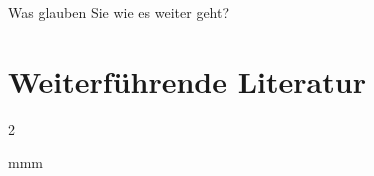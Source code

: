 \noindent Was glauben Sie wie es weiter geht?

\TakeNotesLarge


\section*{\protect\dsliterary{} Weiterführende Literatur}
\begin{WidePar}
\begin{multicols}{2}
\begin{labeling}{mmm}
  \item[\cite{AMLS3}] \emph{}
  \item[\cite{emergency9}] \emph{}
  \item[\cite{ITLSde6}] \emph{}
  \item[\cite{PHTLS6}] \emph{}
  \item[\cite{SemmelABC1}] \emph{}
  \item[\cite{SudoweProfHandelnRD1}] \emph{}
  \item[\cite{KirschnickPflege2}] \emph{}
  \item[\cite{RueckerBildatlas1}] \emph{}
  \item[\cite{Ziesenitz2009}] \emph{}
\end{labeling}
\end{multicols}
\end{WidePar}


